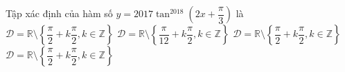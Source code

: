 \begin{ex}%
	Tập xác định của hàm số $y=2017\tan^{2018} \left( 2x+\dfrac{\pi}{3}\right)$ là
	\choice
	{$\mathscr{D}=\mathbb{R}\setminus\left\lbrace\dfrac{\pi}{2}+k\dfrac{\pi}{2}, k\in\mathbb{Z} \right\rbrace $}
	{\True $\mathscr{D}=\mathbb{R}\setminus\left\lbrace\dfrac{\pi}{12}+k\dfrac{\pi}{2}, k\in\mathbb{Z} \right\rbrace $}
	{$\mathscr{D}=\mathbb{R}\setminus\left\lbrace\dfrac{\pi}{2}+k\dfrac{\pi}{2}, k\in\mathbb{Z} \right\rbrace $}
	{$\mathscr{D}=\mathbb{R}\setminus\left\lbrace\dfrac{\pi}{2}+k\dfrac{\pi}{2}, k\in\mathbb{Z} \right\rbrace $}
	\end{ex}
